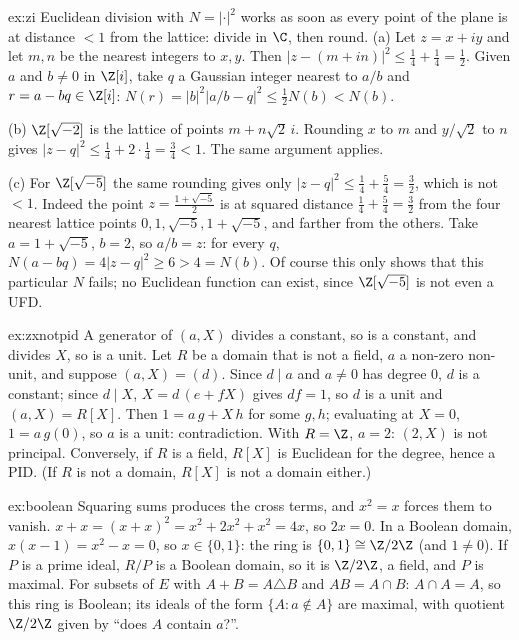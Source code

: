 \begin{solution}{ex:zi}
\idea Euclidean division with $N=|\cdot|^2$ works as soon as every point of the plane is at distance $<1$ from the lattice: divide in $\C$, then round.
\writeup (a) Let $z=x+iy$ and let $m,n$ be the nearest integers to $x,y$. Then $|z-(m+in)|^2\le\frac14+\frac14=\frac12$. Given $a$ and $b\ne0$ in $\Z[i]$, take $q$ a Gaussian integer nearest to $a/b$ and $r=a-bq\in\Z[i]$: $N(r)=|b|^2|a/b-q|^2\le\frac12N(b)<N(b)$.

(b) $\Z[\sqrt{-2}]$ is the lattice of points $m+n\sqrt2\,i$. Rounding $x$ to $m$ and $y/\sqrt2$ to $n$ gives $|z-q|^2\le\frac14+2\cdot\frac14=\frac34<1$. The same argument applies.

(c) For $\Z[\sqrt{-5}]$ the same rounding gives only $|z-q|^2\le\frac14+\frac54=\frac32$, which is not $<1$. Indeed the point $z=\frac{1+\sqrt{-5}}2$ is at squared distance $\frac14+\frac54=\frac32$ from the four nearest lattice points $0,1,\sqrt{-5},1+\sqrt{-5}$, and farther from the others. Take $a=1+\sqrt{-5}$, $b=2$, so $a/b=z$: for every $q$, $N(a-bq)=4|z-q|^2\ge6>4=N(b)$. Of course this only shows that this particular $N$ fails; no Euclidean function can exist, since $\Z[\sqrt{-5}]$ is not even a UFD.
\end{solution}

\begin{solution}{ex:zxnotpid}
\idea A generator of $(a,X)$ divides a constant, so is a constant, and divides $X$, so is a unit.
\writeup Let $R$ be a domain that is not a field, $a$ a non-zero non-unit, and suppose $(a,X)=(d)$. Since $d\mid a$ and $a\ne0$ has degree $0$, $d$ is a constant; since $d\mid X$, $X=d\,(e+fX)$ gives $df=1$, so $d$ is a unit and $(a,X)=R[X]$. Then $1=a\,g+X\,h$ for some $g,h$; evaluating at $X=0$, $1=a\,g(0)$, so $a$ is a unit: contradiction. With $R=\Z$, $a=2$: $(2,X)$ is not principal. Conversely, if $R$ is a field, $R[X]$ is Euclidean for the degree, hence a PID. (If $R$ is not a domain, $R[X]$ is not a domain either.)
\end{solution}

\begin{solution}{ex:boolean}
\idea Squaring sums produces the cross terms, and $x^2=x$ forces them to vanish.
\writeup $x+x=(x+x)^2=x^2+2x^2+x^2=4x$, so $2x=0$. In a Boolean domain, $x(x-1)=x^2-x=0$, so $x\in\{0,1\}$: the ring is $\{0,1\}\cong\Z/2\Z$ (and $1\ne0$). If $P$ is a prime ideal, $R/P$ is a Boolean domain, so it is $\Z/2\Z$, a field, and $P$ is maximal. For subsets of $E$ with $A+B=A\triangle B$ and $AB=A\cap B$: $A\cap A=A$, so this ring is Boolean; its ideals of the form $\{A:a\notin A\}$ are maximal, with quotient $\Z/2\Z$ given by ``does $A$ contain $a$?''.
\end{solution}

